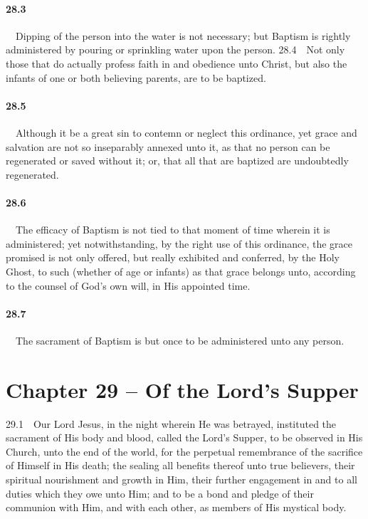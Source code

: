 \paragraph{28.3}\ \ Dipping of the person into the water is not necessary; but Baptism is rightly administered by pouring or sprinkling water upon the person.  28.4\ \ Not only those that do actually profess faith in and obedience unto Christ, but also the infants of one or both believing parents, are to be baptized.   
\bigskip
\paragraph{28.5}\ \ Although it be a great sin to contemn or neglect this ordinance, yet grace and salvation are not so inseparably annexed unto it, as that no person can be regenerated or saved without it; or, that all that are baptized are undoubtedly regenerated.   
\bigskip
\paragraph{28.6}\ \ The efficacy of Baptism is not tied to that moment of time wherein it is administered; yet notwithstanding, by the right use of this ordinance, the grace promised is not only offered, but really exhibited and conferred, by the Holy Ghost, to such (whether of age or infants) as that grace belongs unto, according to the counsel of God's own will, in His appointed time.   
\bigskip
\paragraph{28.7}\ \ The sacrament of Baptism is but once to be administered unto any person.  

\section{Chapter 29 -- Of the Lord's Supper} 29.1\ \ Our Lord Jesus, in the night wherein He was betrayed, instituted the sacrament of His body and blood, called the Lord's Supper, to be observed in His Church, unto the end of the world, for the perpetual remembrance of the sacrifice of Himself in His death; the sealing all benefits thereof unto true believers, their spiritual nourishment and growth in Him, their further engagement in and to all duties which they owe unto Him; and to be a bond and pledge of their communion with Him, and with each other, as members of His mystical body.   
\bigskip
